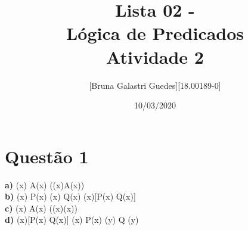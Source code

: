 \documentclass{article}
\title{
    \textbf{Lista 02 - \\Lógica de Predicados\\}
    \medskip
    Atividade 2
}
\author{
\begin{tabular}{l r}
    [Bruna Galastri Guedes]   & [18.00189-0]
\end{tabular}
}
\date{10/03/2020}
\begin{document}
\maketitle
\pagebreak

\section*{Questão 1}

\noindent
\textbf{a)}
        (\exists x) A(x) \leftrightarrow \neg (\forall(x)\neg A(x))\\

    



\noindent
\textbf{b)}
     (\forall x) P(x) \lor (\exists x) Q(x) \longrightarrow (\forall x)[P(x) \lor Q(x)] \\





\noindent
\textbf{c)}
    (\forall x) A(x) \leftrightarrow \neg ((\exists x)\negA(x)) \\



\noindent
\textbf{d)}
        (\forall x)[P(x) \lor Q(x)] \longrightarrow (\forall x) P(x) \lor (\exists y) Q (y)
\end{document}
